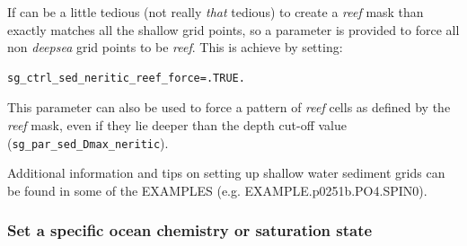 \documentclass[11pt,fleqn]{book} %
\begin{document}
If can be a little tedious (not really \textit{that} tedious) to create a \textit{reef} mask than exactly matches
all the shallow grid points, so a parameter is provided to force all non \textit{deepsea} grid points to be \textit{reef}. This is achieve by setting:
\vspace{-1mm}\begin{verbatim}
sg_ctrl_sed_neritic_reef_force=.TRUE.
\end{verbatim}\vspace{-1mm}
This parameter can also be used to force a pattern of \textit{reef} cells as defined by the \textit{reef} mask, even if they lie deeper than the depth cut-off value (\texttt{sg\_par\_sed\_Dmax\_neritic}).

Additional information and tips on setting up shallow water sediment grids can be found in some of the EXAMPLES (e.g. \textsf{\footnotesize EXAMPLE.p0251b.PO4.SPIN0}).

%
\subsubsection{Set a specific ocean chemistry or saturation state}\label{set_saturation}
\end{document}
